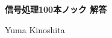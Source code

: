 \documentclass[10pt]{jsarticle}
\begin{document}
\begin{center}
  {\bf \Large 信号処理100本ノック 解答}
\end{center}
\begin{flushright}
  Yuma Kinoshita
\end{flushright}
\setlength{\leftmarginii}{3pt}

% 

\clearpage


% 

% 
\end{document}
